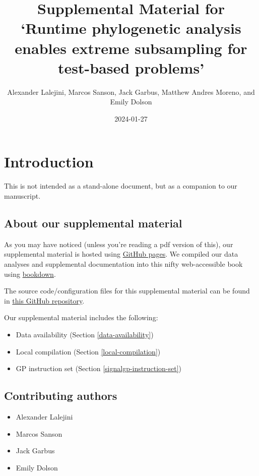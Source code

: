 \documentclass[
]{book}
\title{Supplemental Material for `Runtime phylogenetic analysis enables extreme subsampling for test-based problems'}
\author{Alexander Lalejini, Marcos Sanson, Jack Garbus, Matthew Andres Moreno, and Emily Dolson}
\date{2024-01-27}
\providecommand{\tightlist}{%
  \setlength{\itemsep}{0pt}\setlength{\parskip}{0pt}}
\begin{document}
\maketitle

{
\setcounter{tocdepth}{1}
\tableofcontents
}
\hypertarget{introduction}{%
\chapter{Introduction}\label{introduction}}

This is not intended as a stand-alone document, but as a companion to our manuscript.

\hypertarget{about-our-supplemental-material}{%
\section{About our supplemental material}\label{about-our-supplemental-material}}

As you may have noticed (unless you're reading a pdf version of this), our supplemental material is hosted using \href{https://pages.github.com/}{GitHub pages}.
We compiled our data analyses and supplemental documentation into this nifty web-accessible book using \href{https://bookdown.org}{bookdown}.

The source code/configuration files for this supplemental material can be found in \href{https://github.com/amlalejini/GECCO-2024-phylogeny-informed-subsampling}{this GitHub repository}.

Our supplemental material includes the following:

\begin{itemize}
\tightlist
\item
  Data availability (Section \ref{data-availability})
\item
  Local compilation (Section \ref{local-compilation})
\item
  GP instruction set (Section \ref{signalgp-instruction-set})
\end{itemize}

\hypertarget{contributing-authors}{%
\section{Contributing authors}\label{contributing-authors}}

\begin{itemize}
\tightlist
\item
  Alexander Lalejini
\item
  Marcos Sanson
\item
  Jack Garbus
\item
  Emily Dolson
\end{itemize}
\end{document}
